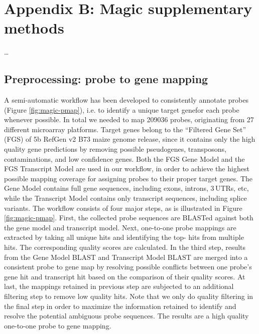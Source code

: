 \chapter{Appendix B: Magic supplementary methods}\label{ch:apd-magic}

\ldots

\instructionsappendices


\section{Preprocessing: probe to gene mapping}

%
%

A semi-automatic workflow has been developed to consistently
annotate probes (Figure \ref{fig:magic-pmap}), i.e. to identify a unique target 
genefor each probe whenever possible. In total we needed to map
209036 probes, originating from 27 different microarray
platforms. Target genes belong to the “Filtered Gene Set” (FGS)
of 5b RefGen v2 B73 maize genome release, since it contains only
the high quality gene predictions by removing possible
pseudogenes, transposons, contaminations, and low confidence
genes. Both the FGS Gene Model and the FGS Transcript Model are
used in our workflow, in order to achieve the highest possible
mapping coverage for assigning probes to their proper target
genes. The Gene Model contains full gene sequences, including
exons, introns, 3\textquotesingle\,UTRs, etc, while the Transcript Model 
contains
only transcript sequences, including splice variants. The
workflow consists of four major steps, as is illustrated in
Figure \ref{fig:magic-pmap}. First, the collected probe sequences are BLASTed
against both the gene model and transcript model. Next,
one-to-one probe mappings are extracted by taking all unique hits
and identifying the top- hits from multiple hits. The
corresponding quality scores are calculated. In the third step,
results from the Gene Model BLAST and Transcript Model BLAST are
merged into a consistent probe to gene map by resolving possible
conflicts between one probe’s gene hit and transcript hit based
on the comparison of their quality scores. At last, the mappings
retained in previous step are subjected to an additional
filtering step to remove low quality hits. Note that we only do
quality filtering in the final step in order to maximize the
information retained to identify and resolve the potential
ambiguous probe sequences. The results are a high quality
one-to-one probe to gene mapping.


